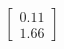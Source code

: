 \documentclass[preview]{standalone}
\begin{document}
\begin{align*}
\begin{bmatrix} 0.11 \\ 1.66 \end{bmatrix}
\end{align*}
\end{document}
